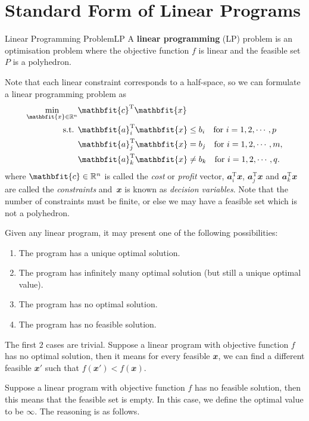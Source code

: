 \documentclass[math, code]{amznotes}
\theoremstyle{remark}
\begin{document}
\section{Standard Form of Linear Programs}
\begin{dfnbox}{Linear Programming Problem}{LP}
    A {\color{red} \textbf{linear programming}} (LP) problem is an optimisation problem where the objective function $f$ is linear and the feasible set $P$ is a polyhedron.
\end{dfnbox}
Note that each linear constraint corresponds to a half-space, so we can formulate a linear programming problem as
\begin{align*}
    \min_{\mathbfit{x} \in \R^n} & \mathbfit{c}^{\mathrm{T}}\mathbfit{x} \\
    \textrm{s.t. } & \mathbfit{a}_i^{\mathrm{T}}\mathbfit{x} \leq b_i \quad \textrm{for } i = 1, 2, \cdots, p \\
    & \mathbfit{a}_j^{\mathrm{T}}\mathbfit{x} = b_j \quad \textrm{for } i = 1, 2, \cdots, m, \\
    & \mathbfit{a}_k^{\mathrm{T}}\mathbfit{x} \neq b_k \quad \textrm{for } i = 1, 2, \cdots, q.
\end{align*}
where $\mathbfit{c} \in \R^n$ is called the \textit{cost} or \textit{profit} vector, $\mathbfit{a}_i^{\mathrm{T}}\mathbfit{x}$, $\mathbfit{a}_j^{\mathrm{T}}\mathbfit{x}$ and $\mathbfit{a}_k^{\mathrm{T}}\mathbfit{x}$ are called the \textit{constraints} and~$\mathbfit{x}$ is known as \textit{decision variables}. Note that the number of constraints must be finite, or else we may have a feasible set which is not a polyhedron.

Given any linear program, it may present one of the following possibilities:
\begin{enumerate}
    \item The program has a unique optimal solution.
    \item The program has infinitely many optimal solution (but still a unique optimal value).
    \item The program has no optimal solution.
    \item The program has no feasible solution.
\end{enumerate}
The first $2$ cases are trivial. Suppose a linear program with objective function $f$ has no optimal solution, then it means for every feasible $\mathbfit{x}$, we can find a different feasible $\mathbfit{x}'$ such that $f(\mathbfit{x}') < f(\mathbfit{x})$.

Suppose a linear program with objective function $f$ has no feasible solution, then this means that the feasible set is empty. In this case, we define the optimal value to be $\infty$. The reasoning is as follows.
\end{document}
